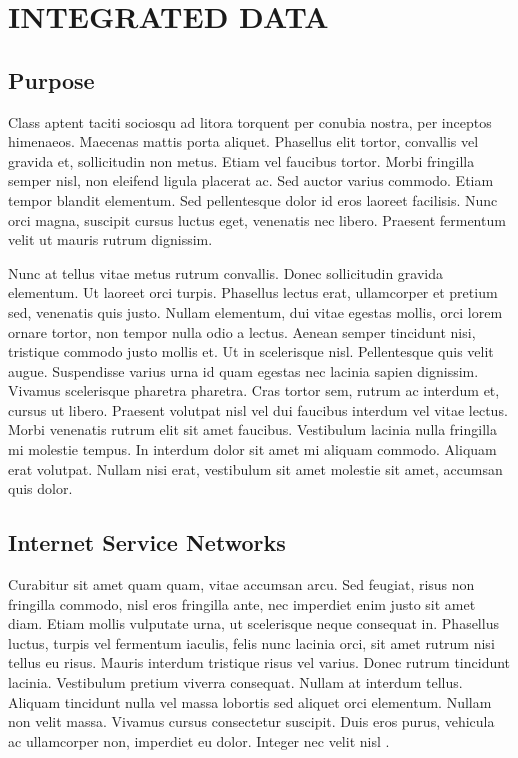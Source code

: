 \chapter{INTEGRATED DATA}\label{CH2}

\section{Purpose}

Class aptent taciti sociosqu ad litora torquent per conubia nostra, per inceptos himenaeos. Maecenas mattis porta
aliquet. Phasellus elit tortor, convallis vel gravida et, sollicitudin non metus. Etiam vel faucibus tortor. Morbi
fringilla semper nisl, non eleifend ligula placerat ac. Sed auctor varius commodo. Etiam tempor blandit elementum. Sed
pellentesque dolor id eros laoreet facilisis. Nunc orci magna, suscipit cursus luctus eget, venenatis nec libero.
Praesent fermentum velit ut mauris rutrum dignissim.

Nunc at tellus vitae metus rutrum convallis. Donec sollicitudin gravida elementum. Ut laoreet orci turpis. Phasellus
lectus erat, ullamcorper et pretium sed, venenatis quis justo. Nullam elementum, dui vitae egestas mollis, orci lorem
ornare tortor, non tempor nulla odio a lectus. Aenean semper tincidunt nisi, tristique commodo justo mollis et. Ut in
scelerisque nisl. Pellentesque quis velit augue. Suspendisse varius urna id quam egestas nec lacinia sapien dignissim.
Vivamus scelerisque pharetra pharetra. Cras tortor sem, rutrum ac interdum et, cursus ut libero. Praesent volutpat nisl
vel dui faucibus interdum vel vitae lectus. Morbi venenatis rutrum elit sit amet faucibus. Vestibulum lacinia nulla
fringilla mi molestie tempus. In interdum dolor sit amet mi aliquam commodo. Aliquam erat volutpat. Nullam nisi erat,
vestibulum sit amet molestie sit amet, accumsan quis dolor. 

\section{Internet Service Networks}

Curabitur sit amet quam quam, vitae accumsan arcu. Sed feugiat, risus non fringilla commodo, nisl eros fringilla ante,
nec imperdiet enim justo sit amet diam. Etiam mollis vulputate urna, ut scelerisque neque consequat in. Phasellus
luctus, turpis vel fermentum iaculis, felis nunc lacinia orci, sit amet rutrum nisi tellus eu risus. Mauris interdum
tristique risus vel varius. Donec rutrum tincidunt lacinia. Vestibulum pretium viverra consequat. Nullam at interdum
tellus. Aliquam tincidunt nulla vel massa lobortis sed aliquet orci elementum. Nullam non velit massa. Vivamus cursus
consectetur suscipit. Duis eros purus, vehicula ac ullamcorper non, imperdiet eu dolor. Integer nec velit nisl
. 

